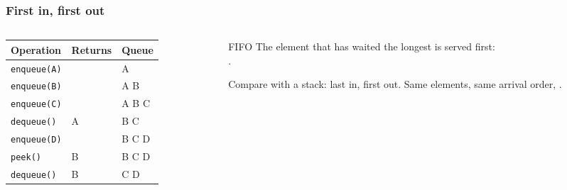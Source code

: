 \documentclass[aspectratio=169,10pt,compress]{beamer}
\begin{document}
\begin{frame}[t,fragile] \frametitle{First in, first out}
  \begin{columns}[T]
    \begin{column}{0.5\textwidth}
      \begin{center}\footnotesize
      \begin{tabular}{lll}
        \toprule
        \textbf{Operation} & \textbf{Returns} & \textbf{Queue} \\
        \midrule
        \texttt{enqueue(A)} &      & A \\
        \texttt{enqueue(B)} &      & A B \\
        \texttt{enqueue(C)} &      & A B C \\
        \texttt{dequeue()}  & A    & B C \\
        \texttt{enqueue(D)} &      & B C D \\
        \texttt{peek()}     & B    & B C D \\
        \texttt{dequeue()}  & B    & C D \\
        \bottomrule
      \end{tabular}
      \end{center}
    \end{column}
    \begin{column}{0.46\textwidth}
      \begin{block}{FIFO}
        The element that has waited the longest is served first:\\
        .
      \end{block}
      \small
      Compare with a stack: last in, first out. Same elements, same arrival order,
      .
    \end{column}
  \end{columns}
\end{frame}
\end{document}
